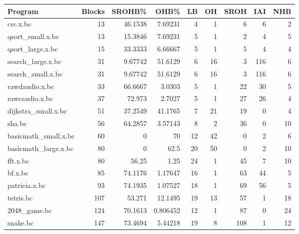\begin{tabular}{lrrrr}
\hline
\end{tabular}\begin{tabular}{lrrrrrrrr}
\hline
 Program              &   Blocks &   SROHB\% &       OHB\% &   LB &   OH &   SROH &   IAI &   NHB \\
\hline
 crc.x.bc             &       13 & 46.1538  &  7.69231   &    4 &    1 &      6 &     6 &     2 \\
 qsort\_small.x.bc     &       13 & 15.3846  &  7.69231   &    5 &    1 &      2 &     4 &     5 \\
 qsort\_large.x.bc     &       15 & 33.3333  &  6.66667   &    5 &    1 &      5 &     4 &     4 \\
 search\_large.x.bc    &       31 &  9.67742 & 51.6129    &    6 &   16 &      3 &   116 &     6 \\
 search\_small.x.bc    &       31 &  9.67742 & 51.6129    &    6 &   16 &      3 &   116 &     6 \\
 rawdaudio.x.bc       &       33 & 66.6667  &  3.0303    &    5 &    1 &     22 &    30 &     5 \\
 rawcaudio.x.bc       &       37 & 72.973   &  2.7027    &    5 &    1 &     27 &    26 &     4 \\
 dijkstra\_small.x.bc  &       51 & 37.2549  & 41.1765    &    7 &   21 &     19 &     0 &     4 \\
 sha.bc               &       56 & 64.2857  &  3.57143   &    8 &    2 &     36 &     0 &    10 \\
 basicmath\_small.x.bc &       60 &  0       & 70         &   12 &   42 &      0 &     2 &     6 \\
 basicmath\_large.x.bc &       80 &  0       & 62.5       &   20 &   50 &      0 &     2 &    10 \\
 fft.x.bc             &       80 & 56.25    &  1.25      &   24 &    1 &     45 &     7 &    10 \\
 bf.x.bc              &       85 & 74.1176  &  1.17647   &   16 &    1 &     63 &    44 &     5 \\
 patricia.x.bc        &       93 & 74.1935  &  1.07527   &   18 &    1 &     69 &    56 &     5 \\
 tetris.bc            &      107 & 53.271   & 12.1495    &   19 &   13 &     57 &     1 &    18 \\
 2048\_game.bc         &      124 & 70.1613  &  0.806452  &   12 &    1 &     87 &     0 &    24 \\
 snake.bc             &      147 & 73.4694  &  5.44218   &   19 &    8 &    108 &     1 &    12 \\

\end{tabular}
